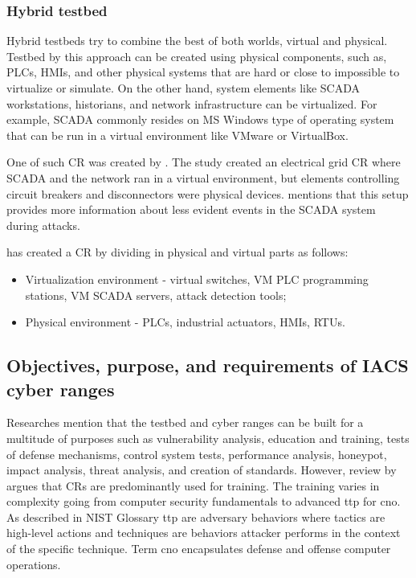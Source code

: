 \subsubsection{Hybrid testbed} \label{subsec:hybrid-testbed}

Hybrid testbeds try to combine the best of both worlds, virtual and physical. Testbed by this approach can be created using physical components, such as, PLCs, HMIs, and other physical systems that are hard or close to impossible to virtualize or simulate. On the other hand, system elements like SCADA workstations, historians, and network infrastructure can be virtualized. For example, SCADA commonly resides on MS Windows type of operating system that can be run in a virtual environment like VMware or VirtualBox.

One of such CR was created by \citeauthor{15-testbed-SCADA-atack} \parencite{15-testbed-SCADA-atack}. The study created an electrical grid CR where SCADA and the network ran in a virtual environment, but elements controlling circuit breakers and disconnectors were physical devices. \citeauthor{15-testbed-SCADA-atack} mentions that this setup provides more information about less evident events in the SCADA system during attacks.

\citeauthor{22-ICS-testbed-design-and-architect} \parencite{22-ICS-testbed-design-and-architect} has created a CR by dividing in physical and virtual parts as follows:

\begin{itemize}
	\item Virtualization environment - virtual switches, VM PLC programming stations, VM SCADA servers, attack detection tools;
	
	\item Physical environment - PLCs, industrial actuators, HMIs, RTUs.
\end{itemize}

\subsection{Objectives, purpose, and requirements of IACS cyber ranges} \label{subsec:objectives-purpose-reqeurements}

Researches \parencite{13-experiences-in-ICS-testbeds, 20-dsign-and-realization-of-testbeds} mention that the testbed and cyber ranges can be built for a multitude of purposes such as vulnerability analysis, education and training, tests of defense mechanisms, control system tests, performance analysis, honeypot, impact analysis, threat analysis, and creation of standards. However, review by \citeauthor{42-surway-australi-unclasified} \parencite{42-surway-australi-unclasified} argues that CRs are predominantly used for training. The training varies in complexity going from computer security fundamentals to advanced \gls*{ttp} for \gls*{cno}. As described in NIST Glossary \parencite{WEB15-nist-glosary} \gls*{ttp} are adversary behaviors where tactics are high-level actions and techniques are behaviors attacker performs in the context of the specific technique. Term \gls*{cno} encapsulates defense and offense computer operations.

